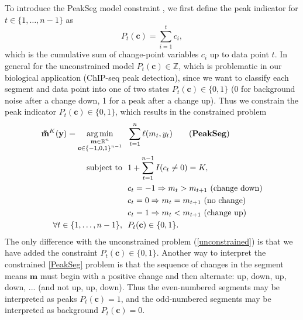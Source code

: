 \documentclass{article}
\DeclareMathOperator*{\argmin}{arg\,min}
\newcommand{\ZZ}{\mathbb Z}
\newcommand{\RR}{\mathbb R}
\begin{document}
To introduce the PeakSeg model constraint \citep{PeakSeg}, we first define
the peak indicator for $t\in\{1, \dots, n-1\}$ as
\begin{equation}
  \label{eq:peaks}
  P_t(\mathbf c) = \sum_{i=1}^t c_i,
\end{equation}
which is the cumulative sum of change-point variables $c_i$ up to data
point $t$. In general for the unconstrained model
$P_t(\mathbf c)\in\ZZ$, which is problematic in our biological
application (ChIP-seq peak detection), since we want to classify each
segment and data point into one of two states
$P_t(\mathbf c)\in \{0, 1\}$ (0 for background noise after a change
down, 1 for a peak after a change up).
Thus we constrain the peak indicator $P_t(\mathbf
c)\in\{0, 1\}$, which results
in the constrained problem
\begin{align}
  \label{PeakSeg}
  \mathbf{\tilde m}^K(\mathbf y) =
    \argmin_{\substack{
  \mathbf m\in\RR^{n}
\\
  \mathbf c\in\{-1,0,1\}^{n-1}
  }} &\ \ 
    \sum_{t=1}^n \ell( m_t,  y_t) 
\tag{\textbf{PeakSeg}}
\\
    \text{subject to} &\ \  1+\sum_{t=1}^{n-1} I(c_t \neq 0) = K, 
\nonumber\\
& \ \ c_t = -1 \Rightarrow m_{t} > m_{t+1} \text{ (change down)}
\nonumber\\
& \ \ c_t = 0 \Rightarrow m_{t} = m_{t+1}  \text{ (no change)}
\nonumber\\
& \ \ c_t = 1 \Rightarrow m_{t} < m_{t+1} \text{ (change up)}
\nonumber\\
\forall t\in\{1, \dots, n-1\}, &\ \ P_t(\mathbf c) \in\{0, 1\}.
\nonumber
\end{align}
The only difference with the unconstrained problem
(\ref{unconstrained}) is that we have added the constraint
$P_t(\mathbf c) \in\{0, 1\}$. Another way to interpret the constrained
\ref{PeakSeg} problem is that the sequence of changes in the segment
means $\mathbf m$ must begin with a positive change and then
alternate: up, down, up, down, ... (and not up, up, down). Thus the
even-numbered segments may be interpreted as peaks $P_t(\mathbf c)=1$,
and the odd-numbered segments may be interpreted as background
$P_t(\mathbf c)=0$.
\end{document}
